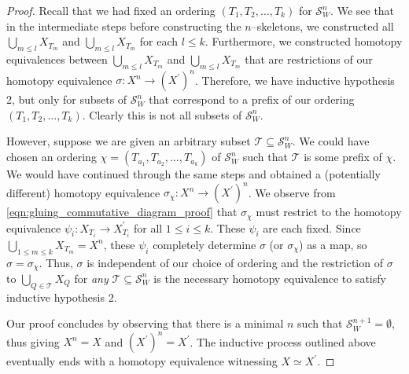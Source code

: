 \documentclass[class=article, crop=false]{standalone}
\begin{document}
\begin{proof}
    Recall that we had fixed an ordering $(T_1, T_2, \ldots , T_k)$ for $\mathcal{S}^{n}_W$. We see that in the intermediate steps before constructing the $n$--skeletons, we constructed all $\bigcup_{m \leq l} X_{T_m}$ and $\bigcup_{m \leq l} X_{T_m}$ for each $l\leq k$. Furthermore, we constructed homotopy equivalences between $\bigcup_{m \leq l} X_{T_m}$ and $\bigcup_{m \leq l} X_{T_m}$ that are restrictions of our homotopy equivalence $\sigma \colon X^n \to (X^\prime)^n$. Therefore, we have inductive hypothesis 2, but only for subsets of $\mathcal{S}_W^n$ that correspond to a prefix of our ordering $(T_1, T_2, \ldots , T_k)$. Clearly this is not all subsets of $\mathcal{S}_W^n$.
    
    However, suppose we are given an arbitrary subset $\mathcal{T} \subseteq \mathcal{S}_W^n$. We could have chosen an ordering $\chi = (T_{a_1}, T_{a_2}, \ldots, T_{a_k})$ of $\mathcal{S}^n_W$ such that $\mathcal{T}$ is some prefix of $\chi$. We would have continued through the same steps and obtained a (potentially different) homotopy equivalence $\sigma_\chi \colon X^n \to (X^\prime)^n$. We observe from \eqref{eqn:gluing_commutative_diagram_proof} that $\sigma_\chi$ must restrict to the homotopy equivalence $\psi_i \colon X_{T_i} \to X^\prime_{T_i}$ for all $1\leq i \leq k$. These $\psi_i$ are each fixed. Since $ \bigcup_{1\leq m\leq k} X_{T_m} = X^n$, these $\psi_i$ completely determine $\sigma$ (or $\sigma_\chi$) as a map, so $\sigma = \sigma_\chi$. Thus, $\sigma$ is independent of our choice of ordering and the restriction of $\sigma$ to $\bigcup_{Q \in \mathcal{T}}X_Q$ for \emph{any} $\mathcal{T}\subseteq \mathcal{S}^n_W$ is the necessary homotopy equivalence to satisfy inductive hypothesis 2.
    
    Our proof concludes by observing that there is a minimal $n$ such that $\mathcal{S}^{n+1}_W = \emptyset$, thus giving $X^n = X$ and $(X^\prime)^n = X^\prime$. The inductive process outlined above eventually ends with a homotopy equivalence witnessing $X \simeq X^\prime$.
\end{proof}
\end{document}
